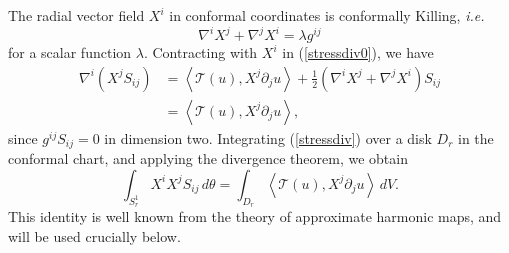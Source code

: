 \documentclass[12pt]{amsart}
\newcommand{\LA}{\left\langle}
\newcommand{\RA}{\right\rangle}
\newcommand{\T}{{\mathcal T}}
\theoremstyle{others}
\numberwithin{equation}{section}
\newcommand{\p}{\partial}
\newcommand{\n}{\nabla}
\begin{document}
The radial vector field $X^i$ in conformal coordinates is conformally Killing, {\it i.e.}
\begin{equation*}
\nabla^i X^j + \n^j X^i = \lambda g^{ij}
\end{equation*}
for a scalar function $\lambda.$ Contracting with $X^i$ in (\ref{stressdiv0}), we have
\begin{equation}\label{stressdiv}
\begin{split}
\nabla^i (X^j S_{ij}) & = \LA \T(u), X^j \p_j u \RA + \frac12 \left( \nabla^i X^j + \n^j X^i \right) S_{ij} \\
& =  \LA \T(u), X^j \p_j u \RA,
\end{split}
\end{equation}
since $g^{ij}S_{ij} = 0$ in dimension two.
Integrating (\ref{stressdiv}) over a disk $D_r$ in the conformal chart, and applying the divergence theorem, we obtain
\begin{equation}\label{stressidentity}
\int_{S^1_r} X^i X^j S_{ij} \, d\theta = \int_{D_r} \LA \T(u), X^j \p_j u \RA \, dV. %
\end{equation}
This identity is well known from the theory of approximate harmonic maps, and will be used crucially below.












\end{document}
